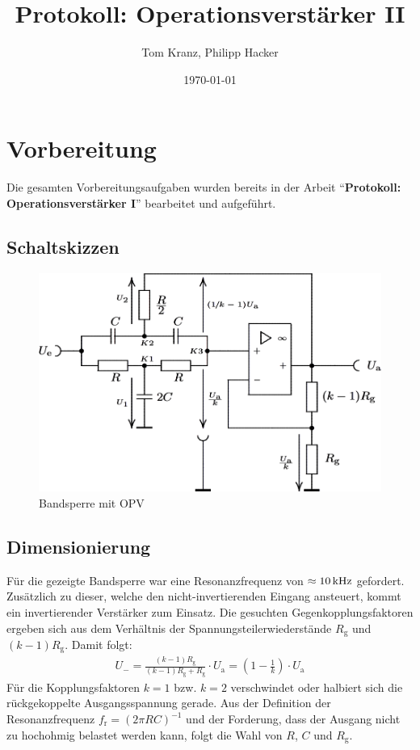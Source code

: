 \documentclass[numbers=noenddot,12pt,a4paper]{scrartcl}
\title{Protokoll: Operationsverstärker II}
\author{Tom Kranz, Philipp Hacker}
\date{\today}
\newcommand{\ix}[1]{_\text{#1}}
\begin{document}
\maketitle
\vspace*{\fill}
\tableofcontents
\vfill
\newpage
\section{Vorbereitung}
Die gesamten Vorbereitungsaufgaben wurden bereits in der Arbeit "`\textbf{Protokoll: Operationsverstärker I}"' bearbeitet und aufgeführt.
\subsection{Schaltskizzen}
\begin{figure}[H]
\centering
\includegraphics[width=\textwidth]{bandsperre.png}
\caption{Bandsperre mit OPV} \label{img:band}
\end{figure}
\subsection{Dimensionierung}
Für die gezeigte Bandsperre war eine Resonanzfrequenz von $\approx\unit[10]{kHz}$ gefordert. Zusätzlich zu dieser, welche den nicht-invertierenden Eingang ansteuert, kommt ein invertierender Verstärker zum Einsatz. Die gesuchten Gegenkopplungsfaktoren ergeben sich aus dem Verhältnis der Spannungsteilerwiederstände $R\ix{g}$ und $ \left(k-1\right)R\ix{g}$. Damit folgt:
\begin{align*}
U_-=\frac{\left(k-1\right)R\ix{g}}{\left(k-1\right)R\ix{g}+R\ix{g}}\cdot U\ix{a}=\left(1-\frac{1}{k}\right)\cdot U\ix{a}
\end{align*}
Für die Kopplungsfaktoren $k=1$ bzw. $k=2$ verschwindet oder halbiert sich die rückgekoppelte Ausgangsspannung gerade. Aus der Definition der Resonanzfrequenz $f\ix{r}=\left(2\pi R C\right)^{-1}$ und der Forderung, dass der Ausgang nicht zu hochohmig belastet werden kann, folgt die Wahl von $R$, $C$ und $R\ix{g}$.
\end{document}
